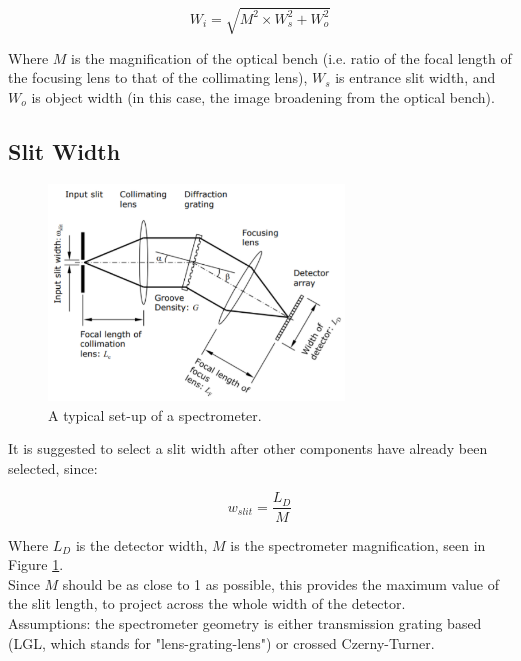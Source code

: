 \begin{equation}
    W_i = \sqrt{M^2\times W_s^2 + W_o^2}
\end{equation}

Where $M$ is the magnification of the optical bench (i.e. ratio of the focal length of the focusing lens to that of the collimating lens), $W_s$ is entrance slit width, and $W_o$ is object width (in this case, the image broadening from the optical bench).

\subsection{Slit Width}

\begin{figure}[H]
\centering
\includegraphics[width=0.7\textwidth]{figures/spectrometer design.PNG}
\caption{A typical set-up of a spectrometer. \cite{Ibsen_photonics_design}}
\label{fig:spectrometer-design}
\end{figure}

It is suggested to select a slit width after other components have already been selected, since:

\begin{equation}
    w_{slit} = \frac{L_D}{M}
\end{equation}

Where $L_D$ is the detector width, $M$ is the spectrometer magnification, seen in Figure \ref{fig:spectrometer-design}.\\
Since $M$ should be as close to 1 as possible, this provides the maximum value of the slit length, to project across the whole width of the detector.\\
Assumptions: the spectrometer geometry is either transmission grating based (LGL, which stands for "lens-grating-lens") or crossed Czerny-Turner.

